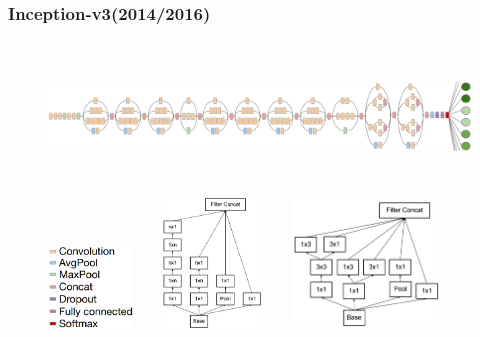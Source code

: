 \documentclass[9pt]{beamer}
\begin{document}
\begin{frame}
	\frametitle{Inception-v3(2014/2016)}
	\begin{figure}
		\includegraphics[width=\textwidth, height=4cm]{./figures/edit/inception_v3.png} \\
		\includegraphics[width=0.2\textwidth]{./figures/edit/inception_layers.png} 
		\hspace{1em}
		\includegraphics[width=0.35\textwidth, height=3.5cm]{./figures/edit/breakdown_02.png}		
		\includegraphics[width=0.35\textwidth, height=3.5cm]{./figures/edit/breakdown_coarse.png}		
	\end{figure}
\end{frame}
\end{document}
